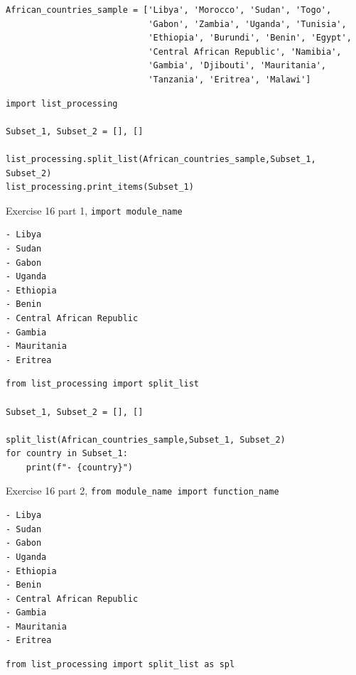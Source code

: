\documentclass[10pt]{book}
\newenvironment{code}{\captionsetup{labelfont=bf, type=listing, name=Snippet, aboveskip=-3pt ,belowskip=15pt}}{}
\begin{document}
\begin{enumerate}
\label{org9a5fbda}
\begin{verbatim}
African_countries_sample = ['Libya', 'Morocco', 'Sudan', 'Togo',
                            'Gabon', 'Zambia', 'Uganda', 'Tunisia',
                            'Ethiopia', 'Burundi', 'Benin', 'Egypt',
                            'Central African Republic', 'Namibia',
                            'Gambia', 'Djibouti', 'Mauritania',
                            'Tanzania', 'Eritrea', 'Malawi']
\end{verbatim}

\label{org599034a}
\begin{code}
\begin{verbatim}
import list_processing

Subset_1, Subset_2 = [], []

list_processing.split_list(African_countries_sample,Subset_1, Subset_2)
list_processing.print_items(Subset_1)
\end{verbatim}
\caption{\label{lst:org0a7f280}Exercise 16 part 1, \texttt{import module\_name}}
\end{code}

\label{org639341b}
\begin{verbatim}
- Libya
- Sudan
- Gabon
- Uganda
- Ethiopia
- Benin
- Central African Republic
- Gambia
- Mauritania
- Eritrea
\end{verbatim}

\label{org381b5e2}
\begin{code}
\begin{verbatim}
from list_processing import split_list

Subset_1, Subset_2 = [], []

split_list(African_countries_sample,Subset_1, Subset_2)
for country in Subset_1:
    print(f"- {country}")
\end{verbatim}
\caption{\label{lst:org6190149}Exercise 16 part 2, \texttt{from module\_name import function\_name}}
\end{code}

\label{org9f253a9}
\begin{verbatim}
- Libya
- Sudan
- Gabon
- Uganda
- Ethiopia
- Benin
- Central African Republic
- Gambia
- Mauritania
- Eritrea
\end{verbatim}

\label{org47e89c3}
\begin{code}
\begin{verbatim}
from list_processing import split_list as spl


\end{verbatim}
\end{code}
\end{enumerate}
\end{document}
